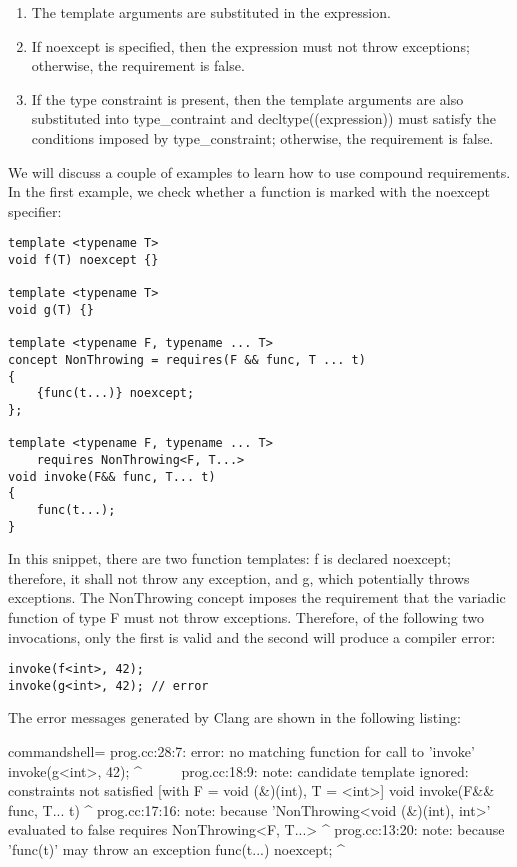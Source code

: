 \begin{enumerate}
\item
The template arguments are substituted in the expression.

\item
If noexcept is specified, then the expression must not throw exceptions; otherwise, the requirement is false.

\item
If the type constraint is present, then the template arguments are also substituted into type\_contraint and decltype((expression)) must satisfy the conditions imposed by type\_constraint; otherwise, the requirement is false.
\end{enumerate}

We will discuss a couple of examples to learn how to use compound requirements. In the first example, we check whether a function is marked with the noexcept specifier:

\begin{lstlisting}[style=styleCXX]
template <typename T>
void f(T) noexcept {}

template <typename T>
void g(T) {}

template <typename F, typename ... T>
concept NonThrowing = requires(F && func, T ... t)
{
	{func(t...)} noexcept;
};

template <typename F, typename ... T>
	requires NonThrowing<F, T...>
void invoke(F&& func, T... t)
{
	func(t...);
}
\end{lstlisting}

In this snippet, there are two function templates: f is declared noexcept; therefore, it shall not throw any exception, and g, which potentially throws exceptions. The NonThrowing concept imposes the requirement that the variadic function of type F must not throw exceptions. Therefore, of the following two invocations, only the first is valid and the second will produce a compiler error:

\begin{lstlisting}[style=styleCXX]
invoke(f<int>, 42);
invoke(g<int>, 42); // error
\end{lstlisting}

The error messages generated by Clang are shown in the following listing:

\begin{tcblisting}{commandshell={}}
prog.cc:28:7: error: no matching function for call to 'invoke'
      invoke(g<int>, 42);
       ^~~~~~
prog.cc:18:9: note: candidate template ignored: constraints not
satisfied [with F = void (&)(int), T = <int>]
   void invoke(F&& func, T... t)
          ^
prog.cc:17:16: note: because 'NonThrowing<void (&)(int), int>'
evaluated to false
      requires NonThrowing<F, T...>
                  ^
prog.cc:13:20: note: because 'func(t)' may throw an exception
      {func(t...)} noexcept;
                       ^
\end{tcblisting}

